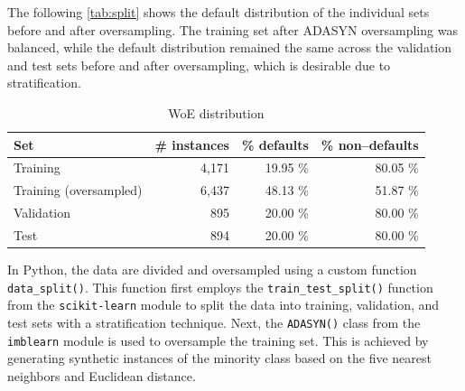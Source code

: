 The following \autoref{tab:split} shows the default distribution of the individual sets before and after oversampling. The training set after ADASYN oversampling was balanced, while the default distribution remained the same across the validation and test sets before and after oversampling, which is desirable due to stratification.

\begin{table}[H]
\small
\setlength{\tabcolsep}{8pt}
\renewcommand{\arraystretch}{1.3}
\centering
    \caption[WoE distribution]{WoE distribution}\label{tab:split}
    \begin{tabular}{lrrr}
\toprule
\textbf{Set} & \textbf{\# instances} & \textbf{\% defaults} & \textbf{\% non--defaults}\\
\midrule
\hline
Training & 4,171  & 19.95 \% & 80.05 \% \\
Training (oversampled) & 6,437 &  48.13 \% & 51.87 \% \\

Validation & 895 &  20.00 \% & 80.00 \% \\

Test & 894 &  20.00 \% & 80.00 \% \\
\hline
\bottomrule
\end{tabular}
\vspace{0.7em}

\vspace{-1em}
\end{table}

In Python, the data are divided and oversampled using a custom function \lstinline{data_split()}.
This function first employs the \lstinline{train_test_split()} function from the \lstinline{scikit-learn} module to split the data into training, validation, and test sets with a stratification technique.
Next, the \lstinline{ADASYN()} class from the \lstinline{imblearn} module is used to oversample the training set. This is achieved by generating synthetic instances of the minority class based on the five nearest neighbors and Euclidean distance.

